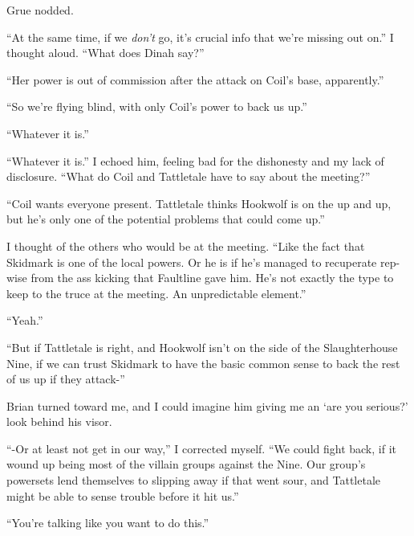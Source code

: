 Grue nodded.



``At the same time, if we \emph{don't} go, it's crucial info that we're missing out on.'' I thought aloud.  ``What does Dinah say?''



``Her power is out of commission after the attack on Coil's base, apparently.''



``So we're flying blind, with only Coil's power to back us up.''



``Whatever it is.''



``Whatever it is.'' I echoed him, feeling bad for the dishonesty and my lack of disclosure. ``What do Coil and Tattletale have to say about the meeting?''



``Coil wants everyone present.  Tattletale thinks Hookwolf is on the up and up, but he's only one of the potential problems that could come up.''



I thought of the others who would be at the meeting.  ``Like the fact that Skidmark is one of the local powers.  Or he is if he's managed to recuperate rep-wise from the ass kicking that Faultline gave him.  He's not exactly the type to keep to the truce at the meeting.  An unpredictable element.''



``Yeah.''



``But if Tattletale is right, and Hookwolf isn't on the side of the Slaughterhouse Nine, if we can trust Skidmark to have the basic common sense to back the rest of us up if they attack-''



Brian turned toward me, and I could imagine him giving me an `are you serious?' look behind his visor.



``-Or at least not get in our way,'' I corrected myself.  ``We could fight back, if it wound up being most of the villain groups against the Nine.  Our group's powersets lend themselves to slipping away if that went sour, and Tattletale might be able to sense trouble before it hit us.''



``You're talking like you want to do this.''



